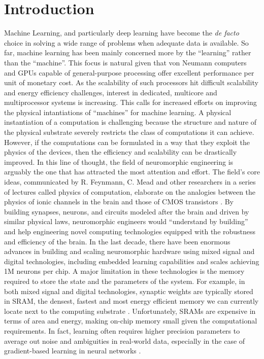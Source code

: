 \documentclass[english]{article}
\renewcommand{\cite}{\citep}
\begin{document}
\section{Introduction}
Machine Learning, and particularly deep learning have become the \emph{de facto} choice in solving a wide range of problems when adequate data is available. 
So far, machine learning has been mainly concerned more by the ``learning'' rather than the ``machine''. 
This focus is natural given that von Neumann computers and GPUs capable of general-purpose processing offer excellent performance per unit of monetary cost.
As the scalability of such processors hit difficult scalability and energy efficiency challenges, interest in dedicated, multicore and multiprocessor systems is increasing.
This calls for increased efforts on improving the physical intantiations of ``machines'' for machine learning. 
A physical instantiation of a computation is challenging because the structure and nature of the physical substrate severely restricts the class of computations it can achieve. 
However, if the computations can be formulated in a way that they exploit the physics of the devices, then the efficiency and scalability can be drastically improved.
In this line of thought, the field of neuromorphic engineering is arguably the one that has attracted the most attention and effort. The field's core ideas, communicated by R. Feynmann, C. Mead and other researchers in a series of lectures called physics of computation, elaborate on the analogies between the physics of ionic channels in the brain and those of CMOS transistors \cite{Mead90_neurelec}.
By building synapses, neurons, and circuits modeled after the brain and driven by similar physical laws, neuromorphic engineers would ``understand by building'' and help engineering novel computing technologies equipped with the robustness and efficiency of the brain.
In the last decade, there have been enormous advances in building and scaling neuromorphic hardware using mixed signal \cite{Benjamin_etal14_neurmixe,Chicca_etal13_neurelec,Park_etal14_65k-73-m,Schemmel_etal10_wafeneur} and digital \cite{Merolla_etal14_millspik,Davies_etal18_loihneur,Furber_etal14_spinproj} technologies, including embedded learning capabilities and scales achieving 1M neurons per chip.
A major limitation in these technologies is the memory required to store the state and the parameters of the system. 
For example, in both mixed signal and digital technologies, synaptic weights are typically stored in SRAM, the densest, fastest and most energy efficient memory we can currently locate next to the computing substrate \cite{Qiao_etal15_recoon-l,Merolla_etal14_millspik,Davies_etal18_loihneur}.
Unfortunately, SRAMs are expensive in terms of area and energy, making on-chip memory small given the computational requirements. 
In fact, learning often requires higher precision parameters to average out noise and ambiguities in real-world data, especially in the case of gradient-based learning in neural networks \cite{Courbariaux_etal14_lowprec}. 
\end{document}

